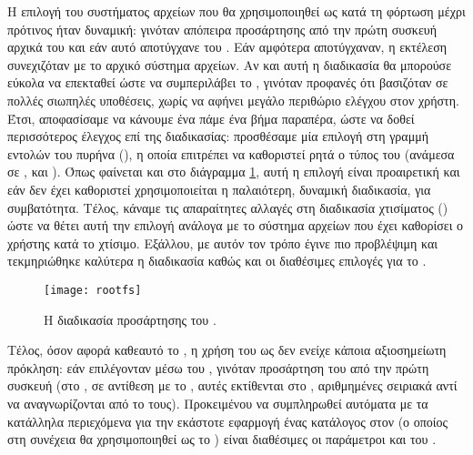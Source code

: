 Η επιλογή του συστήματος αρχείων που θα χρησιμοποιηθεί ως  κατά τη
φόρτωση μέχρι πρότινος ήταν δυναμική: γινόταν απόπειρα προσάρτησης από την
πρώτη συσκευή  αρχικά του  και εάν αυτό αποτύγχανε του
. Εάν αμφότερα αποτύγχαναν, η εκτέλεση συνεχιζόταν με το 
αρχικό σύστημα αρχείων.
Αν και αυτή η διαδικασία θα μπορούσε εύκολα να επεκταθεί ώστε να συμπεριλάβει το
\viofs{}, γινόταν προφανές ότι βασιζόταν σε πολλές σιωπηλές υποθέσεις, χωρίς να
αφήνει μεγάλο περιθώριο ελέγχου στον χρήστη. Έτσι, αποφασίσαμε να κάνουμε ένα
πάμε ένα βήμα παραπέρα, ώστε να δοθεί περισσότερος έλεγχος επί της διαδικασίας:
προσθέσαμε μία επιλογή \texttt{} στη γραμμή εντολών του πυρήνα
(), η οποία επιτρέπει να καθοριστεί ρητά ο τύπος του
 (ανάμεσα σε , \viofs{} και ). Όπως
φαίνεται και στο διάγραμμα \ref{fig:rootfs}, αυτή η επιλογή είναι προαιρετική
και εάν δεν έχει καθοριστεί χρησιμοποιείται η παλαιότερη, δυναμική διαδικασία,
για συμβατότητα. Τέλος, κάναμε τις απαραίτητες αλλαγές στη διαδικασία χτισίματος
() ώστε να θέτει αυτή την επιλογή ανάλογα με το σύστημα
αρχείων που έχει καθορίσει ο χρήστης κατά το χτίσιμο. Εξάλλου, με αυτόν τον
τρόπο έγινε πιο προβλέψιμη και τεκμηριώθηκε καλύτερα η διαδικασία καθώς και οι
διαθέσιμες επιλογές για το .

\begin{figure}
    \centering
    \texttt{[image: rootfs]}
    \caption{Η διαδικασία προσάρτησης του .}
    \label{fig:rootfs}
\end{figure}

Τέλος, όσον αφορά καθεαυτό το \viofs{}, η χρήση του ως 
δεν ενείχε κάποια αξιοσημείωτη πρόκληση: εάν επιλέγονταν μέσω του
\texttt{}, γινόταν προσάρτηση του από την πρώτη \viofs{} συσκευή
(στο \osv{}, σε αντίθεση με το , αυτές εκτίθενται στο ,
αριθμημένες σειριακά αντί να αναγνωρίζονται από το \viofs{}  τους).
Προκειμένου να συμπληρωθεί αυτόματα με τα κατάλληλα περιεχόμενα για την εκάστοτε
εφαρμογή ένας κατάλογος στον \host{} (ο οποίος στη συνέχεια θα χρησιμοποιηθεί
ως το \viofs{} ) είναι διαθέσιμες οι παράμετροι
\texttt{} και \texttt{} του .
